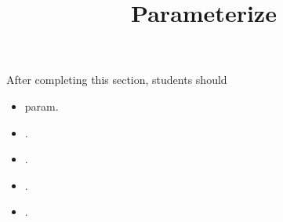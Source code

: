 \documentclass{ximera}
\title{Parameterize}
\begin{document}
\begin{abstract}
\end{abstract}
\maketitle

\begin{sectionOutcomes}
After completing this section, students should 

\begin{itemize}
\item param.
\item .
\item .
\item .
\item .
\end{itemize}
\end{sectionOutcomes}
\end{document}
